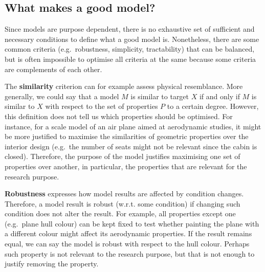 \documentclass[
]{book}
\begin{document}
\hypertarget{what-makes-a-good-model}{%
\subsection{What makes a good model?}\label{what-makes-a-good-model}}

Since models are purpose dependent, there is no exhaustive set of sufficient and necessary conditions to define what a good model is. Nonetheless, there are some common criteria (e.g.~robustness, simplicity, tractability) that can be balanced, but is often impossible to optimise all criteria at the same because some criteria are complements of each other.

The \textbf{similarity} criterion can for example assess physical resemblance. More generally, we could say that a model \(M\) is similar to target \(X\) if and only if \(M\) is similar to \(X\) with respect to the set of properties \(P\) to a certain degree. However, this definition does not tell us which properties should be optimised. For instance, for a scale model of an air plane aimed at aerodynamic studies, it might be more justified to maximise the similarities of geometric properties over the interior design (e.g.~the number of seats might not be relevant since the cabin is closed). Therefore, the purpose of the model justifies maximising one set of properties over another, in particular, the properties that are relevant for the research purpose.

\textbf{Robustness} expresses how model results are affected by condition changes. Therefore, a model result is robust (w.r.t. some condition) if changing such condition does not alter the result. For example, all properties except one (e.g.~plane hull colour) can be kept fixed to test whether painting the plane with a different colour might affect its aerodynamic properties. If the result remains equal, we can say the model is robust with respect to the hull colour. Perhaps such property is not relevant to the research purpose, but that is not enough to justify removing the property.
\end{document}
